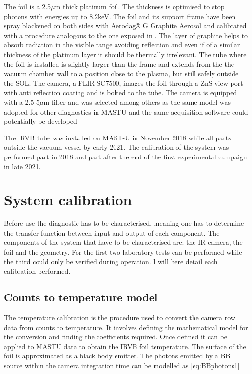 The foil is a 2.5$\mu$m thick platinum foil. The thickness is optimised to stop photons with energies up to 8.2keV. \cite{PETERSON2010,Gullikson2022} The foil and its support frame have been spray blackened on both sides with Aerodag® G Graphite Aerosol and calibrated with a procedure analogous to the one exposed in \cite{Itomi2014}. The layer of graphite helps to absorb radiation in the visible range avoiding reflection and even if of a similar thickness of the platinum layer it should be thermally irrelevant. \cite{VanEden2018} The tube where the foil is installed is slightly larger than the frame and extends from the the vacuum chamber wall to a position close to the plasma, but still safely outside the SOL. The camera, a FLIR SC7500, images the foil through a ZnS view port with anti reflection coating and is bolted to the tube. The camera is equipped with a 2.5-5$\mu$m filter and was selected among others as the same model was adopted for other diagnostics in MASTU and the same acquisition software could potentially be developed.


The IRVB tube was installed on MAST-U in November 2018 while all parts outside the vacuum vessel by early 2021. The calibration of the system was performed part in 2018 and part after the end of the first experimental campaign in late 2021.


\section{System calibration}\label{System calibration}
Before use the diagnostic has to be characterised, meaning one has to determine the transfer function between input and output of each component. The components of the system that have to be characterised are: the IR camera, the foil and the geometry. For the first two laboratory tests can be performed while the third could only be verified during operation. I will here detail each calibration performed.

\subsection{Counts to temperature model}
The temperature calibration is the procedure used to convert the camera row data from counts to temperature. It involves defining the mathematical model for the conversion and finding the coefficients required. Once defined it can be applied to MASTU data to obtain the IRVB foil temperature.
The surface of the foil is approximated as a black body emitter. The photons emitted by a BB source within the camera integration time can be modelled as \autoref{eq:BBphotons1}


